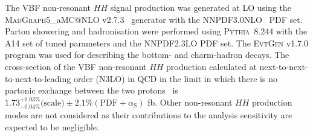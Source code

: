 The VBF non-resonant $HH$ signal production was generated at LO using the
\textsc{MadGraph}5\_aMC@NLO v2.7.3~\cite{Alwall:2014hca} generator with the 
\textsc{NNPDF3.0NLO}~\cite{Ball:2014uwa} PDF set.
Parton showering and hadronisation were performed using \textsc{Pythia~8.244} with the
A14 set of tuned parameters and the \textsc{NNPDF2.3LO} PDF set.
The \textsc{EvtGen} v1.7.0 program was used for describing the bottom- and charm-hadron decays.
The cross-section of the VBF non-resonant $HH$ production calculated at
next-to-next-to-next-to-leading order (N3LO) in QCD in the limit 
in which there is no partonic exchange between the two protons~\cite{Dreyer:2018qbw} is
$1.73^{+0.03\%}_{-0.04\%}\text{(scale)}\pm 2.1\%(\text{PDF}+\alpha_\text{S})$ fb.
Other non-resonant $HH$ production modes are not considered as their contributions
to the analysis sensitivity are expected to be negligible.

